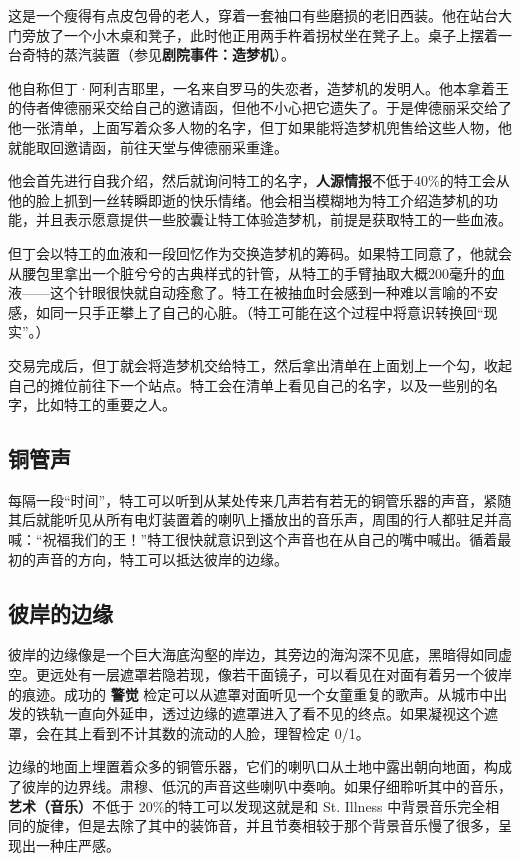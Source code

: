 这是一个瘦得有点皮包骨的老人，穿着一套袖口有些磨损的老旧西装。他在站台大门旁放了一个小木桌和凳子，此时他正用两手杵着拐杖坐在凳子上。桌子上摆着一台奇特的蒸汽装置（参见\textbf{剧院事件：造梦机}）。

他自称但丁·阿利吉耶里，一名来自罗马的失恋者，造梦机的发明人。他本拿着王的侍者俾德丽采交给自己的邀请函，但他不小心把它遗失了。于是俾德丽采交给了他一张清单，上面写着众多人物的名字，但丁如果能将造梦机兜售给这些人物，他就能取回邀请函，前往天堂与俾德丽采重逢。

他会首先进行自我介绍，然后就询问特工的名字，\textbf{人源情报}不低于40\%的特工会从他的脸上抓到一丝转瞬即逝的快乐情绪。他会相当模糊地为特工介绍造梦机的功能，并且表示愿意提供一些胶囊让特工体验造梦机，前提是获取特工的一些血液。

但丁会以特工的血液和一段回忆作为交换造梦机的筹码。如果特工同意了，他就会从腰包里拿出一个脏兮兮的古典样式的针管，从特工的手臂抽取大概200毫升的血液——这个针眼很快就自动痊愈了。特工在被抽血时会感到一种难以言喻的不安感，如同一只手正攀上了自己的心脏。（特工可能在这个过程中将意识转换回“现实”。）

交易完成后，但丁就会将造梦机交给特工，然后拿出清单在上面划上一个勾，收起自己的摊位前往下一个站点。特工会在清单上看见自己的名字，以及一些别的名字，比如特工的重要之人。

\subsection{铜管声}

每隔一段“时间”，特工可以听到从某处传来几声若有若无的铜管乐器的声音，紧随其后就能听见从所有电灯装置着的喇叭上播放出的音乐声，周围的行人都驻足并高喊：“祝福我们的王！”特工很快就意识到这个声音也在从自己的嘴中喊出。循着最初的声音的方向，特工可以抵达彼岸的边缘。

\subsection{彼岸的边缘}

彼岸的边缘像是一个巨大海底沟壑的岸边，其旁边的海沟深不见底，黑暗得如同虚空。更远处有一层遮罩若隐若现，像若干面镜子，可以看见在对面有着另一个彼岸的痕迹。成功的 \textbf{警觉} 检定可以从遮罩对面听见一个女童重复的歌声。从城市中出发的铁轨一直向外延申，透过边缘的遮罩进入了看不见的终点。如果凝视这个遮罩，会在其上看到不计其数的流动的人脸，理智检定 0/1。

边缘的地面上埋置着众多的铜管乐器，它们的喇叭口从土地中露出朝向地面，构成了彼岸的边界线。肃穆、低沉的声音这些喇叭中奏响。如果仔细聆听其中的音乐，\textbf{艺术（音乐）}不低于 20\%的特工可以发现这就是和 St. Illness 中背景音乐完全相同的旋律，但是去除了其中的装饰音，并且节奏相较于那个背景音乐慢了很多，呈现出一种庄严感。

